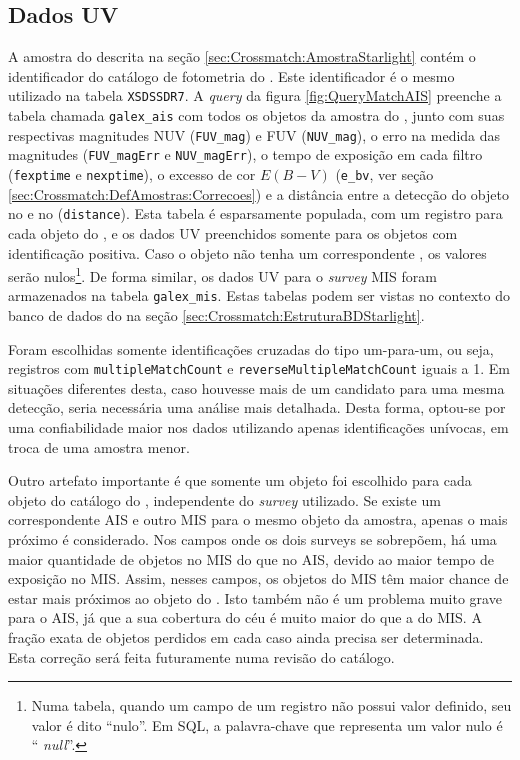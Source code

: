 \subsection{Dados UV}

A amostra do \starlight descrita na seção \ref{sec:Crossmatch:AmostraStarlight}
contém o identificador do catálogo de fotometria do \SDSS. Este identificador é
o mesmo utilizado na tabela \texttt{XSDSSDR7}. A {\em query} da figura
\ref{fig:QueryMatchAIS} preenche a tabela chamada \texttt{galex\_ais} com todos
os objetos da amostra do \starlight, junto com suas respectivas magnitudes NUV
(\texttt{FUV\_mag}) e FUV (\texttt{NUV\_mag}), o erro na medida das magnitudes
({\tt FUV\_magErr} e \texttt{NUV\_magErr}), o tempo de exposição em cada filtro
({\tt fexptime} e \texttt{nexptime}), o excesso de cor $E(B-V)$ (\texttt{e\_bv},
ver seção \ref{sec:Crossmatch:DefAmostras:Correcoes}) e a distância entre a
detecção do objeto no \galex e no \SDSS (\texttt{distance}). Esta tabela é
esparsamente populada, com um registro para cada objeto do \starlight, e os
dados UV preenchidos somente para os objetos com identificação positiva. Caso o
objeto não tenha um correspondente \galex, os valores serão nulos\footnote{Numa
tabela, quando um campo de um registro não possui valor definido, seu valor é
dito ``nulo''. Em SQL, a palavra-chave que representa um valor nulo é ``{\em
null}''.}. De forma similar, os dados UV para o {\em survey} MIS foram
armazenados na tabela \texttt{galex\_mis}. Estas tabelas podem ser vistas no
contexto do banco de dados do \starlight na seção
\ref{sec:Crossmatch:EstruturaBDStarlight}.

Foram escolhidas somente identificações cruzadas do tipo um-para-um, ou seja,
registros com \texttt{multipleMatchCount} e \texttt{reverseMultipleMatchCount}
iguais a 1. Em situações diferentes desta, caso houvesse mais de um candidato
para uma mesma detecção, seria necessária uma análise mais detalhada. Desta
forma, optou-se por uma confiabilidade maior nos dados utilizando apenas
identificações unívocas, em troca de uma amostra menor.

Outro artefato importante é que somente um objeto \galex foi escolhido para cada
objeto do catálogo do \starlight, independente do {\em survey} utilizado. Se
existe um correspondente AIS e outro MIS para o mesmo objeto da amostra, apenas
o mais próximo é considerado. Nos campos onde os dois {surveys} se sobrepõem, há
uma maior quantidade de objetos no MIS do que no AIS, devido ao maior tempo de
exposição no MIS. Assim, nesses campos, os objetos do MIS têm maior chance de
estar mais próximos ao objeto do \SDSS. Isto também não é um problema muito
grave para o AIS, já que a sua cobertura do céu é muito maior do que a do MIS. A
fração exata de objetos perdidos em cada caso ainda precisa ser determinada.
Esta correção será feita futuramente numa revisão do catálogo.

